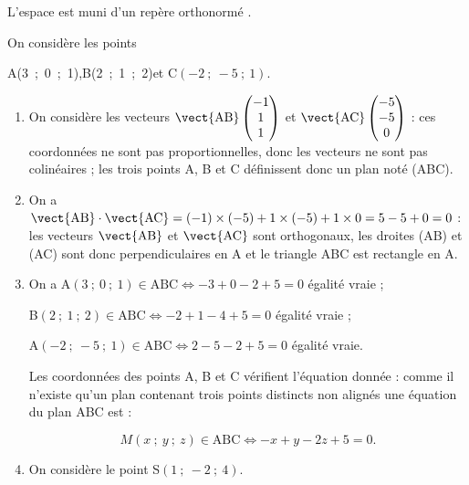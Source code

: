
\medskip

L'espace est muni d'un repère orthonormé \Oijk.

On considère les points 
\begin{center}A(3~;~0~;~1),\qquad  B(2~;~1~;~2)\quad  et \quad C$(- 2~;~- 5~;~1)$.\end{center}

\smallskip

\begin{enumerate}
\item %
On considère les vecteurs $\vect{\text{AB}}\begin{pmatrix}-1\\1\\1\end{pmatrix}$ et $\vect{\text{AC}}\begin{pmatrix}-5\\-5\\0\end{pmatrix}$ : ces coordonnées ne sont pas proportionnelles, donc les vecteurs ne sont pas colinéaires ; les trois points A, B et C définissent donc un plan noté (ABC).
\item %
On a $\vect{\text{AB}} \cdot \vect{\text{AC}} = (- 1) \times (- 5) + 1 \times (- 5) + 1 \times 0 = 5 - 5 + 0 = 0$ : les vecteurs $\vect{\text{AB}}$ et $\vect{\text{AC}}$ sont orthogonaux, les droites (AB) et (AC) sont donc perpendiculaires en A et le triangle ABC est rectangle en A.
\item %
On a A$(3~;~0~;~1) \in \text{ABC} \iff - 3  + 0 - 2 + 5 = 0$ égalité vraie ;

B$(2~;~1~;~2) \in \text{ABC} \iff - 2  + 1 - 4 + 5 = 0$ égalité vraie ;

A$(- 2~;~- 5~;~1) \in \text{ABC} \iff 2  - 5 - 2 + 5 = 0$ égalité vraie.

Les coordonnées des points A, B et C vérifient l'équation donnée : comme il n'existe qu'un plan contenant trois points distincts non alignés une équation du plan ABC est :

\[M(x~;~y~;~z) \in \text{ABC} \iff -x + y - 2z + 5 = 0.\]

\item On considère le point S$(1~;~-2~;~4)$.



\end{enumerate}
